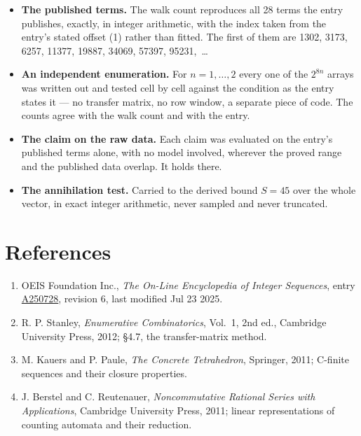 \documentclass[11pt]{article}
\theoremstyle{definition}
\begin{document}
\begin{itemize}

\item {\bfseries The published terms.} The walk count reproduces all 28 terms the entry publishes, exactly, in integer arithmetic, with the index taken from the entry's stated offset (1) rather than fitted. The first of them are 1302, 3173, 6257, 11377, 19887, 34069, 57397, 95231,~\dots

\item {\bfseries An independent enumeration.} For $n = 1,\dots,2$ every one of the $2^{8n}$ arrays was written out and tested cell by cell against the condition as the entry states it --- no transfer matrix, no row window, a separate piece of code. The counts agree with the walk count and with the entry.

\item {\bfseries The claim on the raw data.} Each claim was evaluated on the entry's published terms alone, with no model involved, wherever the proved range and the published data overlap. It holds there.

\item {\bfseries The annihilation test.} Carried to the derived bound $S = 45$ over the whole vector, in exact integer arithmetic, never sampled and never truncated.

\end{itemize}

\section{References}

\begin{enumerate}

\item OEIS Foundation Inc., \emph{The On-Line Encyclopedia of Integer Sequences}, entry \href{https://oeis.org/A250728}{A250728}, revision 6, last modified Jul 23 2025.

\item R. P. Stanley, \emph{Enumerative Combinatorics}, Vol.~1, 2nd ed., Cambridge University Press, 2012; \S4.7, the transfer-matrix method.

\item M. Kauers and P. Paule, \emph{The Concrete Tetrahedron}, Springer, 2011; C-finite sequences and their closure properties.

\item J. Berstel and C. Reutenauer, \emph{Noncommutative Rational Series with Applications}, Cambridge University Press, 2011; linear representations of counting automata and their reduction.

\end{enumerate}
\end{document}
